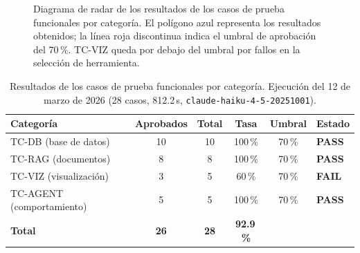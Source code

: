 \begin{figure}[htbp]
\caption{Diagrama de radar de los resultados de los casos de prueba funcionales
  por categoría. El polígono azul representa los resultados obtenidos;
  la línea roja discontinua indica el umbral de aprobación del 70\,\%.
  TC-VIZ queda por debajo del umbral por fallos en la selección de herramienta.}
\label{fig:eval_triangle}
\end{figure}


\begin{table}[htbp]
\centering
\caption{Resultados de los casos de prueba funcionales por categoría.
  Ejecución del 12 de marzo de 2026 (28 casos, 812.2\,s,
  \texttt{claude-haiku-4-5-20251001}).}
\label{tab:tc_resultados}
\small
\begin{tabular}{lccccl}
\toprule
\textbf{Categoría} & \textbf{Aprobados} & \textbf{Total} & \textbf{Tasa} & \textbf{Umbral} & \textbf{Estado} \\
\midrule
TC-DB (base de datos)    & 10 & 10 & 100\,\% & 70\,\% & \textcolor{success}{\textbf{PASS}} \\
TC-RAG (documentos)      &  8 &  8 & 100\,\% & 70\,\% & \textcolor{success}{\textbf{PASS}} \\
TC-VIZ (visualización)   &  3 &  5 &  60\,\% & 70\,\% & \textcolor{accent}{\textbf{FAIL}} \\
TC-AGENT (comportamiento)&  5 &  5 & 100\,\% & 70\,\% & \textcolor{success}{\textbf{PASS}} \\
\midrule
\textbf{Total}           & \textbf{26} & \textbf{28} & \textbf{92.9\,\%} & & \\
\bottomrule
\end{tabular}
\end{table}

